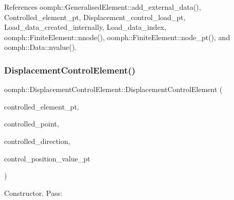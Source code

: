 References oomph\+::\+Generalised\+Element\+::add\+\_\+external\+\_\+data(), Controlled\+\_\+element\+\_\+pt, Displacement\+\_\+control\+\_\+load\+\_\+pt, Load\+\_\+data\+\_\+created\+\_\+internally, Load\+\_\+data\+\_\+index, oomph\+::\+Finite\+Element\+::nnode(), oomph\+::\+Finite\+Element\+::node\+\_\+pt(), and oomph\+::\+Data\+::nvalue().

\mbox{\label{classoomph_1_1DisplacementControlElement_ab6db40f99029a39683a30b17ec58b86a}} 
\subsubsection{\texorpdfstring{Displacement\+Control\+Element()}{DisplacementControlElement()}\hspace{0.1cm}{\footnotesize\ttfamily [2/3]}}
{\footnotesize\ttfamily oomph\+::\+Displacement\+Control\+Element\+::\+Displacement\+Control\+Element (\begin{DoxyParamCaption}\item[{\hyperlink{classoomph_1_1SolidFiniteElement}{Solid\+Finite\+Element} $\ast$}]{controlled\+\_\+element\+\_\+pt,  }\item[{const \hyperlink{classoomph_1_1Vector}{Vector}$<$ double $>$ \&}]{controlled\+\_\+point,  }\item[{const unsigned \&}]{controlled\+\_\+direction,  }\item[{double $\ast$}]{control\+\_\+position\+\_\+value\+\_\+pt }\end{DoxyParamCaption})\hspace{0.3cm}{\ttfamily [inline]}}



Constructor. Pass\+: 


